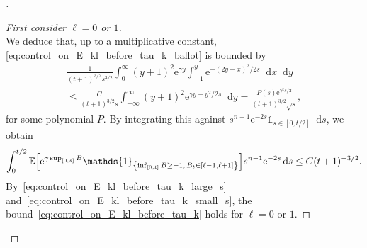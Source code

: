 \documentclass[10pt]{amsart}
\theoremstyle{definition}\newtheorem{defi}[theo]{Definition}\newtheorem{rema}[theo]{Remark}\newtheorem{exam}[theo]{Example}\newtheorem{exem}[theo]{Example}\newtheorem{nota}[theo]{Notation}
\newcommand{\e}{\mathrm{e}}
\renewcommand{\d}[1]{\mathop{}\!\mathrm{d}#1}
\newcommand{\E}{\mathbb{E}}
\newcommand\1{\mathds{1}}
\let\originalleft\left
\let\originalright\right
\renewcommand{\left}{\mathopen{}\mathclose\bgroup\originalleft}
\renewcommand{\right}{\aftergroup\egroup\originalright}
\newenvironment{proofc}[1][\proofname]{\begin{proof}[#1]}{\end{proof}}
\begin{document}
\begin{proofc}
\begin{proof}[{First consider $\ell = 0$ or $1$}]
\begin{equation}
\end{equation}
We deduce that, up to a multiplicative constant, \eqref{eq:control_on_E_kl_before_tau_k_ballot} is bounded by
\begin{multline}
\frac{1}{(t + 1)^{3/2} s^{3/2}} \int_0^\infty (y + 1)^2 \e^{\gamma y} \int_{-1}^y \e^{-(2y - x)^2/2s} \d{x} \d{y}  \\
\leq \frac{C}{(t + 1)^{3/2} s} \int_{-\infty}^\infty (y + 1)^2 \e^{\gamma y - y^2/2s} \d{y} = \frac{P(s) \e^{\gamma^2 s/2}}{(t + 1)^{3/2} \sqrt{s}},
\end{multline}
for some polynomial $P$. By integrating this against $s^{n-1} \e^{-2s} \1_{s \in [0, t/2]} \d{s}$, we obtain
\begin{equation}\label{eq:control_on_E_kl_before_tau_k_small_s}
\int_0^{t/2} \E \left[\e^{\gamma \sup_{[0, s]} B} \1_{\left\{\inf_{[0, t]} B \geq -1,\, B_t \in [\ell-1, \ell+1]\right\}} \right] s^{n-1} \e^{-2s} \d{s} \leq C (t + 1)^{-3/2}.
\end{equation}
By~\eqref{eq:control_on_E_kl_before_tau_k_large_s} and~\eqref{eq:control_on_E_kl_before_tau_k_small_s}, the bound~\eqref{eq:control_on_E_kl_before_tau_k} holds for $\ell = 0$ or $1$.
\let\qed\relax
\end{proof}


\end{proofc}
\end{document}
